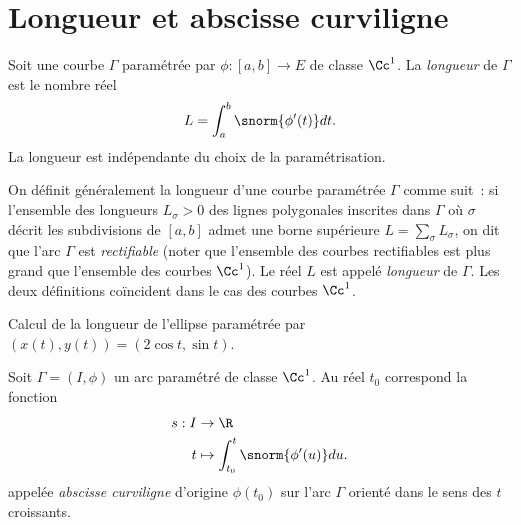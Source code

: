\sld{\vfill\pagebreak[5]}%

\section{Longueur et abscisse curviligne}

\begin{definition}
	Soit une courbe $\Gamma$ paramétrée par $\phi:[a,b] \to E$ de classe $\Cc^1$. La \emph{longueur} de $\Gamma$ est le nombre réel  
	\[
		L = \int_a^b \snorm{\phi'(t)}dt.
	\] 
La longueur est indépendante du choix de la paramétrisation.
\end{definition}

\begin{remark}
	On définit généralement la longueur d'une courbe paramétrée $\Gamma$ comme suit~: si l'ensemble des longueurs $L_\sigma>0$ des lignes polygonales inscrites dans $\Gamma$ où $\sigma$ décrit les subdivisions de $[a,b]$ admet une borne supérieure $L = \sum_{\sigma} L_{\sigma}$, on dit que l'arc $\Gamma$ est \emph{rectifiable} (noter que l'ensemble des courbes rectifiables est plus grand que l'ensemble des courbes $\Cc^1$). Le réel $L$ est appelé \emph{longueur} de $\Gamma$. Les deux définitions coïncident dans le cas des courbes $\Cc^1$.




\end{remark}

\begin{exemple}
	Calcul de la longueur de l'ellipse paramétrée par $(x(t),y(t)) = (2\cos t,\sin t)$.
 \pl{\rep{4cm}}
\end{exemple}

\begin{definition}
	Soit $\Gamma=(I,\phi)$ un arc paramétré de classe $\Cc^1$. Au réel $t_0$ correspond la fonction
	\begin{align*}
		s: I &\to \R\\
		t & \mapsto \int_{t_0}^t \snorm{\phi'(u)} du.
	\end{align*}
	appelée \emph{abscisse curviligne} d'origine $\phi(t_0)$ sur l'arc $\Gamma$ orienté dans le sens des $t$ croissants.
\end{definition}

